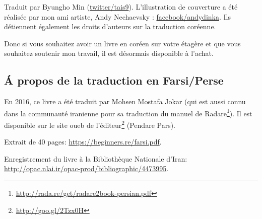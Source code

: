Traduit par Byungho Min (\href{http://go.yurichev.com/17344}{twitter/tais9}).
L'illustration de couverture a été réalisée par mon ami artiste, Andy Nechaevsky :
\href{http://go.yurichev.com/17023}{facebook/andydinka}.
Ils détiennent également les droits d'auteurs sur la traduction coréenne.

Donc si vous souhaitez avoir un livre  en coréen sur votre étagère et que vous souhaitez soutenir mon travail, il est désormais disponible à l'achat.

\subsection*{Á propos de la traduction en Farsi/Perse}

En 2016, ce livre a été traduit par Mohsen Mostafa Jokar (qui est aussi connu dans
la communauté iranienne pour sa traduction du manuel de Radare\footnote{\url{http://rada.re/get/radare2book-persian.pdf}}).
Il est disponible sur le site oueb de l'éditeur\footnote{\url{http://goo.gl/2Tzx0H}}
(Pendare Pars).

Extrait de 40 pages: \url{https://beginners.re/farsi.pdf}.

Enregistrement du livre à la Bibliothèque Nationale d'Iran: \url{http://opac.nlai.ir/opac-prod/bibliographic/4473995}.

